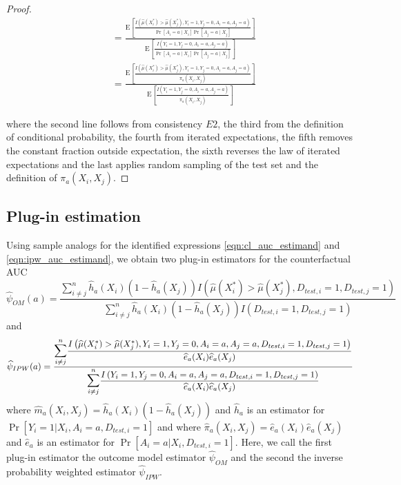 \begin{proof}
$$\begin{aligned}
& = \frac{\mathrm{E}\left[\frac{I\left(\widehat{\mu}(X_i^*)>\widehat{\mu}(X_j^*), Y_i=1, Y_j=0, A_i = a, A_j = a\right)}{\operatorname{Pr}\left[A_i = a \mid X_i\right] \operatorname{Pr}\left[A_j = a \mid X_j\right]} \right]}{\mathrm{E}\left[\frac{I\left(Y_i=1, Y_j=0, A_i = a, A_j = a\right)}{\operatorname{Pr}[A_i = a \mid X_i] \Pr[A_j = a \mid X_j]}\right]} \\
& = \frac{\mathrm{E}\left[\frac{I\left(\widehat{\mu}(X_i^*)>\widehat{\mu}(X_j^*), Y_i=1, Y_j=0, A_i = a, A_j = a\right)}{\pi_a(X_i, X_j)} \right]}{\mathrm{E}\left[\frac{I\left(Y_i=1, Y_j=0, A_i = a, A_j = a\right)}{\pi_a(X_i, X_j)}\right]} 
\end{aligned}
$$

   
where the second line follows from consistency $E2$, the third from the definition of conditional probability, the fourth from iterated expectations, the fifth removes the constant fraction outside expectation, the sixth reverses the law of iterated expectations and the last applies random sampling of the test set and the definition of $\pi_a(X_i, X_j)$.
\end{proof}

\subsection{Plug-in estimation}
Using sample analogs for the identified expressions \ref{eqn:cl_auc_estimand} and \ref{eqn:ipw_auc_estimand}, we obtain two plug-in estimators for the counterfactual AUC
    \begin{equation*}
        \widehat{\psi}_{OM}(a) = \frac{\sum_{i \neq j}^n\widehat{h}_a(X_i) (1 - \widehat{h}_a(X_j)) I(\widehat{\mu}(X_i^*)>\widehat{\mu}(X_j^*), D_{test, i} = 1,  D_{test, j} = 1) }{\sum_{i \neq j}^n\widehat{h}_a(X_i) (1 - \widehat{h}_a(X_j)) I(D_{test, i} = 1,  D_{test, j} = 1)}
    \end{equation*}
    and 
    \begin{equation*}
        \widehat{\psi}_{IPW}(a) = \frac{\mathlarger{\mathlarger{\sum}}_{i \neq j}^n \dfrac{I\left(\widehat{\mu}(X_i^*)>\widehat{\mu}(X_j^*), Y_i = 1, Y_j = 0, A_i = a, A_j = a, D_{test, i} = 1,  D_{test, j} = 1\right)}{\widehat{e}_a(X_i) \widehat{e}_a(X_j)}}{\mathlarger{\mathlarger{\sum}}_{i \neq j}^n\dfrac{I\left(Y_i = 1, Y_j = 0, A_i = a, A_j = a, D_{test, i} = 1,  D_{test, j} = 1\right)}{\widehat{e}_a(X_i) \widehat{e}_a(X_j)}}
    \end{equation*}
    where $\widehat{m}_a(X_i, X_j) = \widehat{h}_a(X_i) (1 - \widehat{h}_a(X_j))$ and $\widehat{h}_a$ is an estimator for $\operatorname{Pr}[Y_i=1 | X_i,A_i = a, D_{test,i} = 1]$ and where $\widehat{\pi}_a(X_i, X_j) = \widehat{e}_a(X_i) \widehat{e}_a(X_j)$ and $\widehat{e}_a$ is an estimator for $\Pr[A_i = a | X_i, D_{test,i} = 1]$. Here, we call the first plug-in estimator the outcome model estimator $ \widehat{\psi}_{OM}$ and the second the inverse probability weighted estimator $\widehat{\psi}_{IPW}$. 

